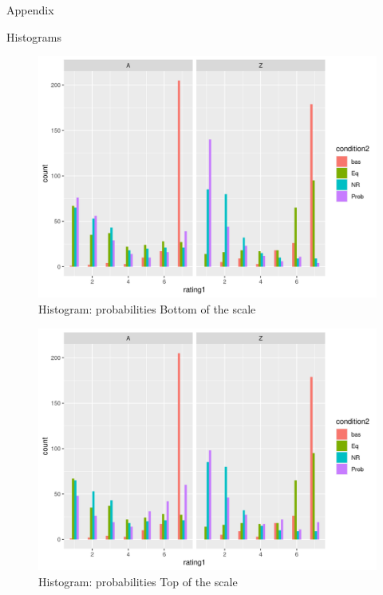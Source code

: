 \documentclass[
  ignorenonframetext,
]{beamer}
\begin{document}
\begin{frame}{Appendix}
\protect\hypertarget{appendix}{}
\begin{block}{Histograms}
\protect\hypertarget{histograms}{}
\begin{figure}

{\centering \includegraphics{"histogram_faceted_prob_bott.png"}

}

\caption{Histogram: probabilities Bottom of the scale}

\end{figure}
\end{block}
\end{frame}

\begin{frame}
\begin{figure}

{\centering \includegraphics{"histogram_faceted_prob_top.png"}

}

\caption{Histogram: probabilities Top of the scale}

\end{figure}
\end{frame}
\end{document}
